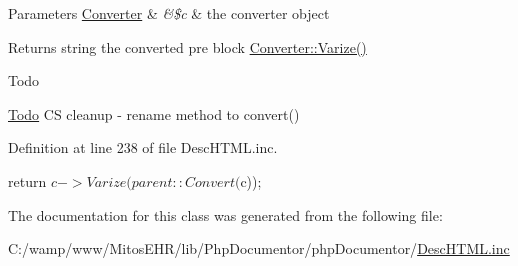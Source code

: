 \begin{DoxyParams}[1]{\-Parameters}
\hyperlink{class_converter}{\-Converter} & {\em \&\$c} & the converter object\\
\hline
\end{DoxyParams}
\begin{DoxyReturn}{\-Returns}
string the converted pre block  \hyperlink{class_converter_ab5014a0099a471ee2670502b8906484f}{\-Converter\-::\-Varize()} 
\end{DoxyReturn}
\begin{DoxyRefDesc}{\-Todo}
\item[\hyperlink{todo__todo000036}{\-Todo}]\-C\-S cleanup -\/ rename method to convert() \end{DoxyRefDesc}


\-Definition at line 238 of file \-Desc\-H\-T\-M\-L.\-inc.


\begin{DoxyCode}
    {
        return $c->Varize(parent::Convert($c));
    }
\end{DoxyCode}


\-The documentation for this class was generated from the following file\-:\begin{DoxyCompactItemize}
\item 
\-C\-:/wamp/www/\-Mitos\-E\-H\-R/lib/\-Php\-Documentor/php\-Documentor/\hyperlink{_desc_h_t_m_l_8inc}{\-Desc\-H\-T\-M\-L.\-inc}\end{DoxyCompactItemize}
